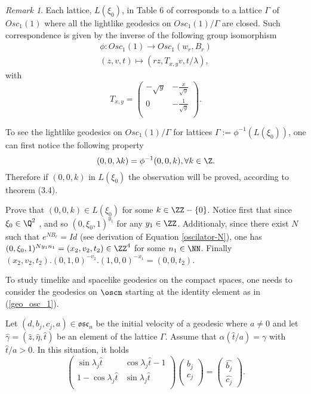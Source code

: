 \documentclass[12pt]{amsart}
\theoremstyle{plain}
\theoremstyle{definition}
\theoremstyle{remark}
\newtheorem{rem}{Remark}
\begin{document}
        \begin{rem}
            Each lattice, $L(\xi_0)$, in Table 6 of \cite{MF} corresponds to a lattice $\Gamma$ of $Osc_1(1)$ where all the lightlike geodesics on $Osc_1(1)/\Gamma$ are closed. Such correspondence is given by the inverse of the following group isomorphism \cite{MF}
              \begin{eqnarray}
                  \phi: Osc_1(1) \rightarrow Osc_1(w_r, B_r) \\
                  (z,v,t) \mapsto (r z, T_{x,y} v, t/\lambda),
              \end{eqnarray}
              with $$T_{x,y} = \left( \begin{matrix}
				-\sqrt{y} & -\frac{x}{\sqrt{y}} \\
				0 & -\frac{1}{\sqrt{y}} \\
			\end{matrix} \right).$$

   To see  the lightlike geodesics on $Osc_1(1)/\Gamma$ for lattices $\Gamma := \phi^{-1}(L(\xi_0))$, one can first notice the following property $$(0,0,\lambda k) = \phi^{-1}(0,0,k), \forall k \in \Z. $$ Therefore if $(0,0,k)$ in $L(\xi_0)$ the observation will be proved, according to theorem (3.4).

   Prove that $(0,0,k) \in L(\xi_0)$ for some $k \in \ZZ - \{ 0 \}$. Notice first that since $\xi_0 \in \Q^2$ \cite{MF}, and so $(0,\xi_0,1)^{y_1}$ for any $y_1 \in \ZZ$. Additionaly, since there exist $N$ such that $e^{N B_r} = Id$ (see derivation of Equation \eqref{oscilator-N}), one has  $(0,\xi_0,1)^{N y_1 n_1} = (x_2,v_2,t_2) \in \ZZ^4$ for some $n_1 \in \NN$. Finally $(x_2, v_2, t_2) . (0,1,0)^{-v_2} . (1, 0, 0)^{-x_1} = (0,0,t_2)$.
        \end{rem}
		
		To  study  timelike and spacelike geodesics on the compact spaces, one needs to  consider the geodesics on $\oscn$ starting at the identity element as in (\ref{geo_osc_1}).
		
		 Let  $(d,b_j,c_j,a)\in \mathfrak{osc}_n$ be the initial velocity of a geodesic where $a\neq0$ and let $\hat{\gamma}=(\hat{z}, \hat{\eta}, \hat{t})$ be an element of the lattice $\Gamma$. Assume that $\alpha(\hat{t}/a)=\gamma$ with $\hat{t}/a > 0$. In this situation, it holds		
		\begin{equation}\label{oscilador_geos_1}
			\left( \begin{matrix}
				\sin{\lambda_j \hat{t}} & \cos{\lambda_j \hat{t}} -1 \\
				1 - \cos{\lambda_j \hat{t}} & \sin{\lambda_j \hat{t}} \\
			\end{matrix} \right)
			\left( \begin{matrix}
				b_j \\
				c_j \\
			\end{matrix} \right)=
			\left( \begin{matrix}
				\hat{b_j} \\
				\hat{c_j}
			\end{matrix} \right).
		\end{equation}
		
\end{document}
